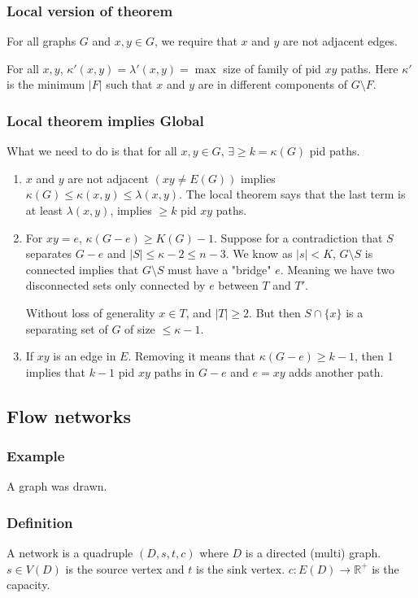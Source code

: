\documentclass[11pt]{article}
\def\R{\mathbb{R}}
\def\max{\operatorname{max}}
\begin{document}
\subsubsection{Local version of theorem}
\label{sec:orgfb96ea4}
For all graphs \(G\) and \(x, y \in G\), we require that \(x\) and \(y\) are not
adjacent edges.

For all \(x, y\), \(\kappa'(x, y) = \lambda'(x, y) = \max\) size of family of
pid \(xy\) paths. Here \(\kappa'\) is the minimum \(\vert F \vert\) such that \(x\)
and \(y\) are in different components of \(G\setminus F\).
\subsubsection{Local theorem implies Global}
\label{sec:org7835857}
What we need to do is that for all \(x, y \in G\), \(\exists \ge k = \kappa(G)\)
pid paths.
\begin{enumerate}
\item \(x\) and \(y\) are not adjacent \((xy \neq E(G))\) implies \(\kappa(G) \le
       \kappa(x, y)\le \lambda(x, y)\). The local theorem says that the last term
is at least \(\lambda(x, y)\), implies \(\ge k\) pid \(xy\) paths.
\item For \(xy = e\), \(\kappa(G-e) \ge K(G) - 1\). Suppose for a contradiction
that \(S\) separates \(G-e\) and \(\vert S \vert \le \kappa - 2 \le n-3\). We
know as \(\vert s \vert < K\), \(G\setminus S\) is connected implies that
\(G\setminus S\) must have a "bridge" \(e\). Meaning we have two disconnected
sets only connected by \(e\) between \(T\) and \(T'\).

Without loss of generality \(x \in T\), and \(\vert T \vert \ge 2\). But then
\(S \cap \{x\}\) is a separating set of \(G\) of size \(\le \kappa - 1\).
\item If \(xy\) is an edge in \(E\). Removing it means that \(\kappa(G-e) \ge k-1\),
then 1 implies that \(k-1\) pid \(xy\) paths in \(G-e\) and \(e=xy\) adds another
path.
\end{enumerate}
\subsection{Flow networks}
\label{sec:orgd66b7b2}
\subsubsection{Example}
\label{sec:org9ea5dea}
A graph was drawn.
\subsubsection{Definition}
\label{sec:org60d0f7f}
A network is a quadruple \((D, s, t, c)\) where \(D\) is a directed (multi)
graph. \(s \in V(D)\) is the source vertex and \(t\) is the sink vertex. \(c
    \colon E(D) \rightarrow \R^{+}\) is the capacity.
\end{document}
